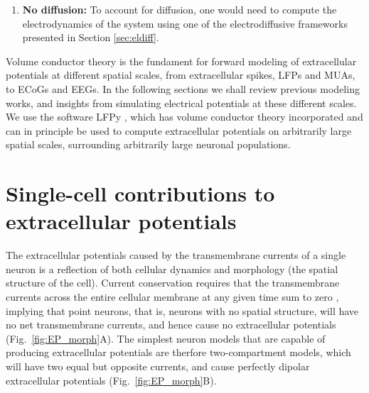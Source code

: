 \documentclass[preprint,11pt,authoryear]{elsarticle}
\newcommand{\hlb}[2][blue]{ {\sethlcolor{#1} \hl{#2}} }
\newcommand{\ghnote}[1]{\color{white}{\hlb{GH: #1 }}\color{black}}
\begin{document}
\begin{enumerate}
\item {\bf No diffusion:} To account for diffusion, one would need to compute the electrodynamics of the system using one of the electrodiffusive frameworks presented in Section \ref{sec:eldiff}.

\end{enumerate}

Volume conductor theory is the fundament for forward modeling of extracellular potentials at different spatial scales, from extracellular spikes, LFPs and MUAs, to ECoGs and EEGs. In the following sections we shall review previous modeling works, and insights from simulating electrical potentials at these different scales.
We use the software LFPy \citep{Linden2014, Hagen2018, Hagen2019}, which has volume conductor theory incorporated and can in principle be used to compute extracellular potentials on arbitrarily large spatial scales, surrounding arbitrarily large neuronal populations. 


\section{Single-cell contributions to extracellular potentials}



The extracellular potentials caused by the transmembrane currents of a single neuron is a reflection of both cellular dynamics and morphology (the spatial structure of the cell). 
Current conservation requires that the transmembrane currents across the entire cellular membrane at any given time sum to zero \citep{Koch1999, Nunez2006}, implying that point neurons, that is, neurons with no spatial structure, will have no net transmembrane currents, and hence cause no extracellular potentials (Fig.~\ref{fig:EP_morph}A). The simplest neuron models that are capable of producing extracellular potentials are therfore two-compartment models, which will have two equal but opposite currents, and cause perfectly dipolar extracellular potentials (Fig.~\ref{fig:EP_morph}B).
\end{document}
